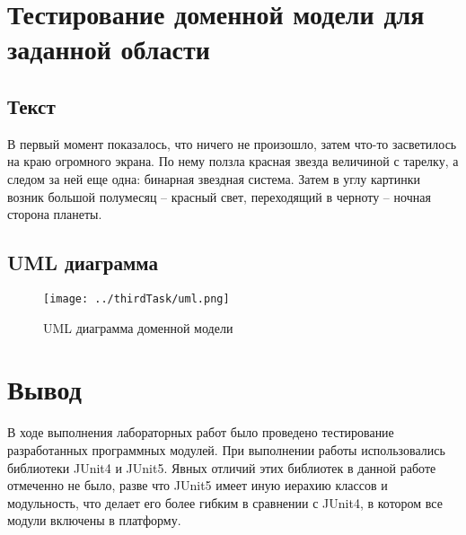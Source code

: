 \documentclass[a4paper,10pt]{article}
\begin{document}
\section*{Тестирование доменной модели для заданной области}
    \subsection*{Текст}
    	В первый момент показалось, что ничего не произошло, затем что-то засветилось на краю огромного экрана. 
        По нему ползла красная звезда величиной с тарелку, а следом за ней еще одна: бинарная звездная система.
        Затем в углу картинки возник большой полумесяц -- красный свет, переходящий в черноту -- ночная сторона планеты. 
    \subsection*{UML диаграмма}
        \begin{figure}[h!]
			\texttt{[image: ../thirdTask/uml.png]}
			\caption{UML диаграмма доменной модели}
		\end{figure}     
\newpage
\section*{Вывод}
    В ходе выполнения лабораторных работ было проведено тестирование разработанных программных модулей.
	При выполнении работы использовались библиотеки JUnit4 и JUnit5. Явных отличий этих библиотек
    в данной работе отмеченно не было, разве что JUnit5 имеет иную иерахию классов и модульность, 
    что делает его более гибким в сравнении с JUnit4, в котором все модули включены в платформу.
\end{document}
